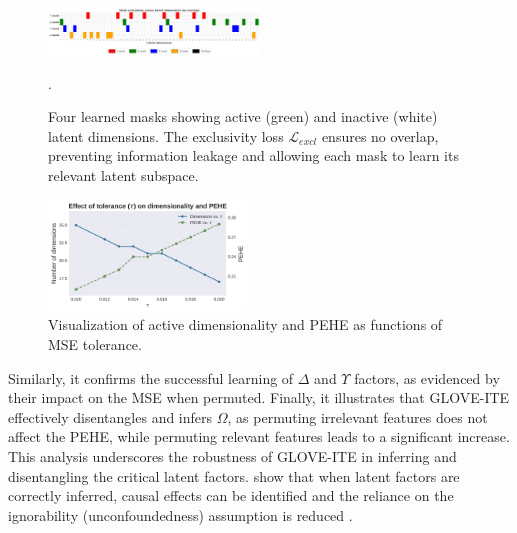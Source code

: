 \documentclass[doubleblind]{ecai}
\begin{document}
	\begin{figure}[h]
		\centering
		
		\includegraphics[width=0.5\textwidth]{Images/orthogonal_new_2.png}
		
		\caption{	
			Four learned masks showing active (green) and inactive (white) latent dimensions. The exclusivity loss $\mathcal{L}_{\mathit{excl}}$ ensures no overlap, preventing information leakage and allowing each mask to learn its relevant latent subspace.}
		
		.
		
		
		\label{fig:ortho}
		
	\end{figure}


	
	
	\begin{figure}[h]
		\centering
		
		\includegraphics[width=0.47\textwidth]{Images/tol_vs_dims_pehe_new.png}
		
		
		
		\caption{Visualization of active dimensionality and PEHE as functions of MSE tolerance.}
		
		\label{fig:tolerance}
		
	\end{figure}
	
	Similarly, it confirms the successful learning of $\Delta$ and $\Upsilon$ factors, as evidenced by their impact on the MSE when permuted. Finally, it illustrates that GLOVE-ITE effectively disentangles and infers $\Omega$, as permuting irrelevant features does not affect the PEHE, while permuting relevant features leads to a significant increase. This analysis underscores the robustness of GLOVE-ITE in inferring and disentangling the critical latent factors. \citet{CEVAE,lowe2022amortized} show that when latent factors are correctly inferred, causal effects can be identified and the reliance on the ignorability (unconfoundedness) assumption is reduced \citep{vowels2021targeted}. 
	
\end{document}

